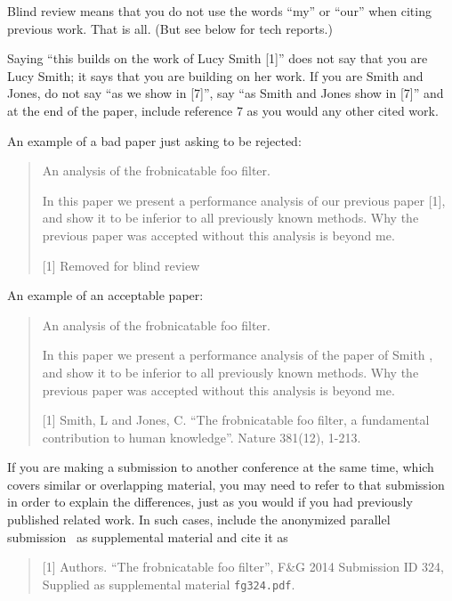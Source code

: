Blind review means that you do not use the words ``my'' or ``our'' when citing previous work.
That is all.
(But see below for tech reports.)

Saying ``this builds on the work of Lucy Smith [1]'' does not say that you are Lucy Smith;
it says that you are building on her work.
If you are Smith and Jones, do not say ``as we show in [7]'', say ``as Smith and Jones show in [7]'' and at the end of the paper, include reference 7 as you would any other cited work.

An example of a bad paper just asking to be rejected:
\begin{quote}
\begin{center}
    An analysis of the frobnicatable foo filter.
\end{center}

   In this paper we present a performance analysis of our previous paper [1], and show it to be inferior to all previously known methods.
   Why the previous paper was accepted without this analysis is beyond me.

   [1] Removed for blind review
\end{quote}


An example of an acceptable paper:
\begin{quote}
\begin{center}
     An analysis of the frobnicatable foo filter.
\end{center}

   In this paper we present a performance analysis of the  paper of Smith \etal [1], and show it to be inferior to all previously known methods.
   Why the previous paper was accepted without this analysis is beyond me.

   [1] Smith, L and Jones, C. ``The frobnicatable foo filter, a fundamental contribution to human knowledge''. Nature 381(12), 1-213.
\end{quote}

If you are making a submission to another conference at the same time, which covers similar or overlapping material, you may need to refer to that submission in order to explain the differences, just as you would if you had previously published related work.
In such cases, include the anonymized parallel submission~\cite{Authors14} as supplemental material and cite it as
\begin{quote}
[1] Authors. ``The frobnicatable foo filter'', F\&G 2014 Submission ID 324, Supplied as supplemental material {\tt fg324.pdf}.
\end{quote}

